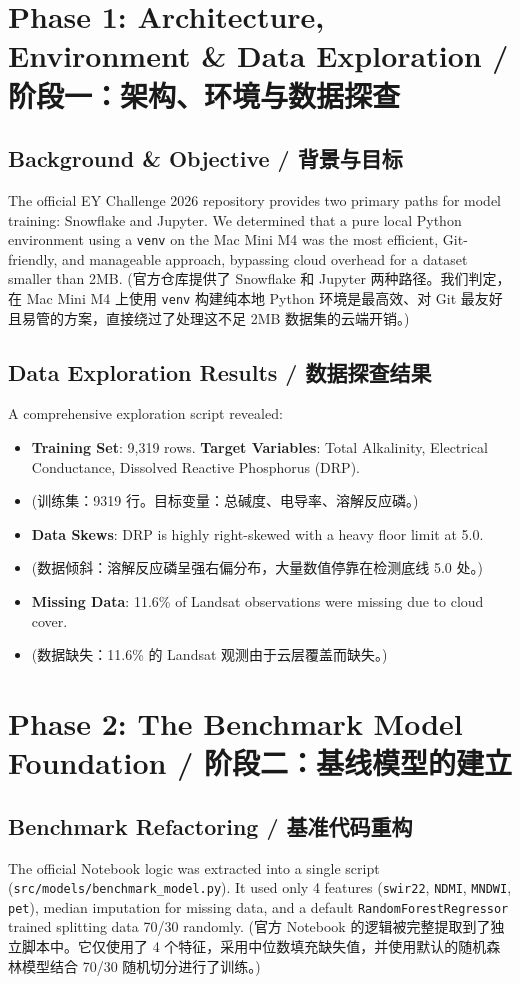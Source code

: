 \section{Phase 1: Architecture, Environment \& Data Exploration / 阶段一：架构、环境与数据探查}

\subsection{Background \& Objective / 背景与目标}
The official EY Challenge 2026 repository provides two primary paths for model training: Snowflake and Jupyter. We determined that a pure local Python environment using a \texttt{venv} on the Mac Mini M4 was the most efficient, Git-friendly, and manageable approach, bypassing cloud overhead for a dataset smaller than 2MB. 
(官方仓库提供了 Snowflake 和 Jupyter 两种路径。我们判定，在 Mac Mini M4 上使用 \texttt{venv} 构建纯本地 Python 环境是最高效、对 Git 最友好且易管的方案，直接绕过了处理这不足 2MB 数据集的云端开销。)

\subsection{Data Exploration Results / 数据探查结果}
A comprehensive exploration script revealed:
\begin{itemize}
    \item \textbf{Training Set}: 9,319 rows. \textbf{Target Variables}: Total Alkalinity, Electrical Conductance, Dissolved Reactive Phosphorus (DRP).
    \item (训练集：9319 行。目标变量：总碱度、电导率、溶解反应磷。)
    \item \textbf{Data Skews}: DRP is highly right-skewed with a heavy floor limit at 5.0.
    \item (数据倾斜：溶解反应磷呈强右偏分布，大量数值停靠在检测底线 5.0 处。)
    \item \textbf{Missing Data}: 11.6\% of Landsat observations were missing due to cloud cover.
    \item (数据缺失：11.6\% 的 Landsat 观测由于云层覆盖而缺失。)
\end{itemize}

\section{Phase 2: The Benchmark Model Foundation / 阶段二：基线模型的建立}

\subsection{Benchmark Refactoring / 基准代码重构}
The official Notebook logic was extracted into a single script (\texttt{src/models/benchmark\_model.py}). It used only 4 features (\texttt{swir22}, \texttt{NDMI}, \texttt{MNDWI}, \texttt{pet}), median imputation for missing data, and a default \texttt{RandomForestRegressor} trained splitting data 70/30 randomly.
(官方 Notebook 的逻辑被完整提取到了独立脚本中。它仅使用了 4 个特征，采用中位数填充缺失值，并使用默认的随机森林模型结合 70/30 随机切分进行了训练。)

